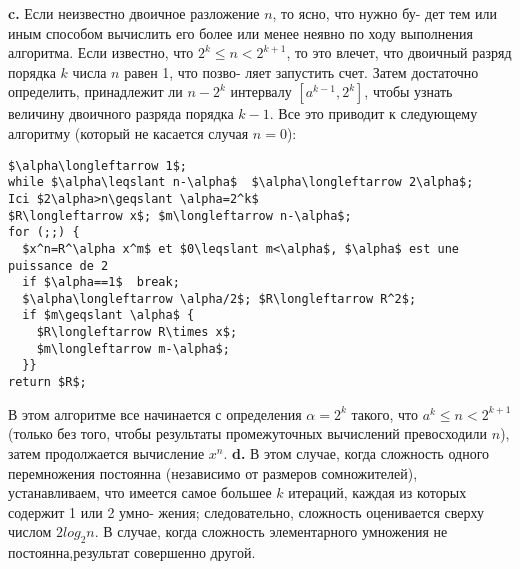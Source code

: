 \textbf{c.} Если неизвестно двоичное разложение $n$, то ясно, что нужно бу-\linebreak
дет тем или иным способом вычислить его более или менее неявно по\linebreak
ходу выполнения алгоритма. Если известно, что $2^k \leqslant n < 2^{k+1}$, то это\linebreak
влечет, что двоичный разряд порядка $k$ числа $n$ равен 1, что позво-\linebreak
ляет запустить счет. Затем достаточно определить, принадлежит ли\linebreak
$n-2^k$ интервалу $[a^{k-1},2^k]$, чтобы узнать величину двоичного разряда\linebreak
порядка $k-1$. Все это приводит к следующему алгоритму (который не\linebreak
касается случая $n=0$):
\begin{lstlisting}[xleftmargin=15pt, mathescape=true]
$\alpha\longleftarrow 1$;
while $\alpha\leqslant n-\alpha$  $\alpha\longleftarrow 2\alpha$;
Ici $2\alpha>n\geqslant \alpha=2^k$
$R\longleftarrow x$; $m\longleftarrow n-\alpha$;
for (;;) {
  $x^n=R^\alpha x^m$ et $0\leqslant m<\alpha$, $\alpha$ est une puissance de 2
  if $\alpha==1$  break;
  $\alpha\longleftarrow \alpha/2$; $R\longleftarrow R^2$;
  if $m\geqslant \alpha$ {
    $R\longleftarrow R\times x$;
    $m\longleftarrow m-\alpha$;
  }}
return $R$;
\end{lstlisting}
\hspace*{15pt}В этом алгоритме все начинается с определения $\alpha=2^k$ такого, что\linebreak
$a^k \leqslant n < 2^{k+1}$ (только без того, чтобы результаты промежуточных\linebreak
вычислений превосходили $n$), затем продолжается вычисление $x^n$.\newline
\hspace*{15pt}\textbf{d.} В этом случае, когда сложность одного перемножения постоянна\linebreak
(независимо от размеров сомножителей), устанавливаем, что имеется\linebreak
самое большее $k$ итераций, каждая из которых содержит 1 или 2 умно-\linebreak
жения; следовательно, сложность оценивается сверху числом $2log_2n$.\newline
\hspace*{15pt}В случае, когда сложность элементарного умножения не постоянна,\linebreak результат совершенно другой.\\

